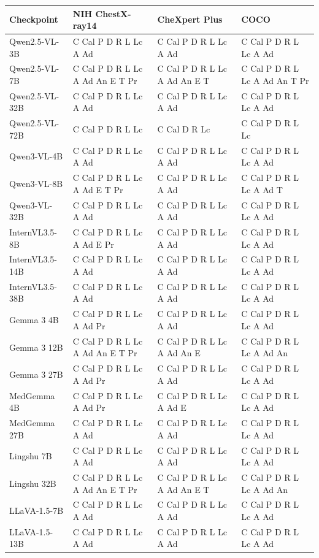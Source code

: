 \documentclass{article}
\begin{document}
\begin{table}[htbp]
{\begin{tabular}{llll}
\toprule
Checkpoint & NIH ChestX-ray14 & CheXpert Plus & COCO\\
\midrule
Qwen2.5-VL-3B & C Cal P D R L Lc A Ad & C Cal P D R L Lc A Ad & C Cal P D R L Lc A Ad \\
Qwen2.5-VL-7B & C Cal P D R L Lc A Ad An E T Pr & C Cal P D R L Lc A Ad An E T & C Cal P D R L Lc A Ad An T Pr \\
Qwen2.5-VL-32B & C Cal P D R L Lc A Ad & C Cal P D R L Lc A Ad & C Cal P D R L Lc A Ad \\
Qwen2.5-VL-72B & C Cal P D R L Lc & C Cal D R Lc & C Cal P D R L Lc \\
Qwen3-VL-4B & C Cal P D R L Lc A Ad & C Cal P D R L Lc A Ad & C Cal P D R L Lc A Ad \\
Qwen3-VL-8B & C Cal P D R L Lc A Ad E T Pr & C Cal P D R L Lc A Ad & C Cal P D R L Lc A Ad T \\
Qwen3-VL-32B & C Cal P D R L Lc A Ad & C Cal P D R L Lc A Ad & C Cal P D R L Lc A Ad \\
InternVL3.5-8B & C Cal P D R L Lc A Ad E Pr & C Cal P D R L Lc A Ad & C Cal P D R L Lc A Ad \\
InternVL3.5-14B & C Cal P D R L Lc A Ad & C Cal P D R L Lc A Ad & C Cal P D R L Lc A Ad \\
InternVL3.5-38B & C Cal P D R L Lc A Ad & C Cal P D R L Lc A Ad & C Cal P D R L Lc A Ad \\
Gemma 3 4B & C Cal P D R L Lc A Ad Pr & C Cal P D R L Lc A Ad & C Cal P D R L Lc A Ad \\
Gemma 3 12B & C Cal P D R L Lc A Ad An E T Pr & C Cal P D R L Lc A Ad An E & C Cal P D R L Lc A Ad An \\
Gemma 3 27B & C Cal P D R L Lc A Ad Pr & C Cal P D R L Lc A Ad & C Cal P D R L Lc A Ad \\
MedGemma 4B & C Cal P D R L Lc A Ad Pr & C Cal P D R L Lc A Ad E & C Cal P D R L Lc A Ad \\
MedGemma 27B & C Cal P D R L Lc A Ad & C Cal P D R L Lc A Ad & C Cal P D R L Lc A Ad \\
Lingshu 7B & C Cal P D R L Lc A Ad & C Cal P D R L Lc A Ad & C Cal P D R L Lc A Ad \\
Lingshu 32B & C Cal P D R L Lc A Ad An E T Pr & C Cal P D R L Lc A Ad An E T & C Cal P D R L Lc A Ad An \\
LLaVA-1.5-7B & C Cal P D R L Lc A Ad & C Cal P D R L Lc A Ad & C Cal P D R L Lc A Ad \\
LLaVA-1.5-13B & C Cal P D R L Lc A Ad & C Cal P D R L Lc A Ad & C Cal P D R L Lc A Ad \\

\end{tabular}}
\end{table}
\end{document}
